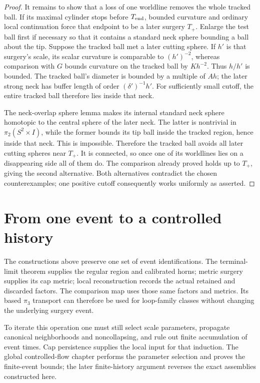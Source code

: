 \begin{proof}
It remains to show that a loss of one worldline removes the whole
tracked ball.  If its maximal cylinder stops before $T_{\rm end}$,
bounded curvature and ordinary local continuation force that endpoint
to be a later surgery $T_+$.  Enlarge the test ball first if necessary
so that it contains a standard neck sphere bounding a ball about
the tip.  Suppose the tracked ball met a later cutting sphere.
If $h'$ is that surgery's scale, its scalar curvature is comparable
to $(h')^{-2}$, whereas comparison with $G$ bounds curvature on the
tracked ball by $Kh^{-2}$.  Thus $h/h'$ is bounded.  The tracked
ball's diameter is bounded by a multiple of $Ah$; the later strong
neck has buffer length of order $(\delta')^{-1}h'$.  For sufficiently
small cutoff, the entire tracked ball therefore lies inside that
neck.

The neck-overlap sphere lemma makes its internal standard neck
sphere homotopic to the central sphere of the later neck.  The
latter is nontrivial in $\pi_2(S^2\times I)$, while the former
bounds its tip ball inside the tracked region, hence inside that
neck.  This is impossible.  Therefore the tracked ball avoids all
later cutting spheres near $T_+$.  It is connected, so once one of
its worldlines lies on a disappearing side all of them do.
The comparison already proved holds up to $T_+$, giving the second
alternative.  Both alternatives contradict the chosen counterexamples;
one positive cutoff consequently works uniformly as asserted.
\end{proof}

\section{From one event to a controlled history}
\label{sec:surgery-interfaces}

The constructions above preserve one set of event identifications.
The terminal-limit theorem supplies the regular region and calibrated
horns; metric surgery supplies its cap metric; local reconstruction
records the actual retained and discarded factors.  The comparison
map uses those same factors and metrics.  Its based $\pi_3$ transport
can therefore be used for loop-family classes without changing the
underlying surgery event.

To iterate this operation one must still select scale parameters,
propagate canonical neighborhoods and noncollapsing, and rule out
finite accumulation of event times.  Cap persistence supplies the
local input for that induction.  The global controlled-flow chapter
performs the parameter selection and proves the finite-event bounds;
the later finite-history argument reverses the exact assemblies
constructed here.
